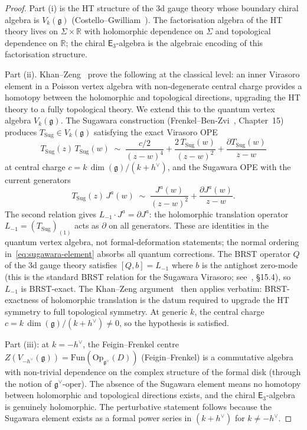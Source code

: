 \documentclass[11pt,reqno]{amsart}
\theoremstyle{definition}
\theoremstyle{remark}
\newcommand{\Ethree}{\mathsf{E}_{3}}
\newcommand{\fg}{\mathfrak{g}}
\newcommand{\RR}{\mathbb{R}}
\numberwithin{equation}{section}
\begin{document}
\begin{proof}
Part (i) is the HT structure of the $3$d gauge theory
whose boundary chiral algebra is $V_k(\fg)$
(Costello--Gwilliam~\cite{CG17}). The factorisation
algebra of the HT theory lives on $\Sigma \times \RR$
with holomorphic dependence on $\Sigma$ and topological
dependence on $\RR$; the chiral $\Ethree$-algebra is the
algebraic encoding of this factorisation structure.

Part (ii).
Khan--Zeng~\cite{KhanZeng25} prove the following at the
classical level: an inner Virasoro element in a Poisson
vertex algebra with non-degenerate central charge provides
a homotopy between the holomorphic and topological
directions, upgrading the HT theory to a fully topological
theory. We extend this to the quantum vertex algebra
$V_k(\fg)$. The Sugawara construction
(Frenkel--Ben-Zvi~\cite{FBZ04}, Chapter~15) produces
$T_{\mathrm{Sug}} \in V_k(\fg)$ satisfying the exact
Virasoro OPE
\[
  T_{\mathrm{Sug}}(z)\,T_{\mathrm{Sug}}(w) \;\sim\;
  \frac{c/2}{(z-w)^4}
  + \frac{2\,T_{\mathrm{Sug}}(w)}{(z-w)^2}
  + \frac{\partial T_{\mathrm{Sug}}(w)}{z-w}
\]
at central charge $c = k\,\dim(\fg)/(k+h^\vee)$, and the
Sugawara OPE with the current generators
\[
  T_{\mathrm{Sug}}(z)\,J^a(w) \;\sim\;
  \frac{J^a(w)}{(z-w)^2}
  + \frac{\partial J^a(w)}{z-w}.
\]
The second relation gives $L_{-1} \cdot J^a = \partial J^a$:
the holomorphic translation operator $L_{-1} = (T_{\mathrm{Sug}})_{(1)}$
acts as $\partial$ on all generators. These are identities in
the quantum vertex algebra, not formal-deformation statements;
the normal ordering in~\eqref{eq:sugawara-element} absorbs
all quantum corrections.  The BRST operator $Q$ of the $3$d
gauge theory satisfies $[Q, b] = L_{-1}$ where $b$ is the
antighost zero-mode (this is the standard BRST relation for
the Sugawara Virasoro; see~\cite{FBZ04}, \S15.4), so
$L_{-1}$ is BRST-exact. The Khan--Zeng
argument~\cite{KhanZeng25} then applies verbatim: BRST-exactness
of holomorphic translation is the datum required to upgrade
the HT symmetry to full topological symmetry. At generic
$k$, the central charge
$c = k\,\dim(\fg)/(k+h^\vee) \neq 0$, so the hypothesis is
satisfied.

Part (iii): at $k = -h^\vee$, the Feigin--Frenkel centre
$Z(V_{-h^\vee}(\fg)) = \mathrm{Fun}(\mathrm{Op}_{\fg^\vee}(D))$
(Feigin--Frenkel) is a commutative
algebra with non-trivial dependence on the complex structure
of the formal disk (through the notion of $\fg^\vee$-oper).
The absence of the Sugawara element means no homotopy
between holomorphic and topological directions exists, and
the chiral $\Ethree$-algebra is genuinely holomorphic.
The perturbative statement follows because the Sugawara
element exists as a formal power series in $(k + h^\vee)$ for
$k \neq -h^\vee$.
\end{proof}
\end{document}
